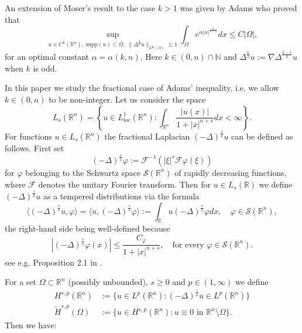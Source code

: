\documentclass[11pt, a4paper]{article}
\newcommand{\R}{\mathbb{R}}
\DeclareMathOperator{\loc}{loc}
\begin{document}

An extension of Moser's result to the case $k>1$ was given by Adams \cite{ada}  who proved that
\begin{equation}\label{stimaMT0b}
\sup_{u\in C^k(\R^{n}),\;\mathrm{supp}(u)\subset\bar\Omega,\;\|\Delta^\frac{k}{2} u\|_{L^\frac{n}{k}(\Omega)}\le 1} \int_\Omega e^{\alpha |u|^\frac{n}{n-k}}dx \le C|\Omega|,
\end{equation}
for an optimal constant $\alpha=\alpha(k,n)$. Here $k\in (0,n)\cap\mathbb{N}$ and $\Delta^\frac{k}{2} u:=\nabla\Delta^\frac{k-1}{2}u$ when $k$ is odd. 

In this paper we study the fractional case of Adams' inequality, i.e. we allow $k\in (0,n)$ to be non-integer. %
Let us consider the space
\begin{equation*}
L_{s}(\R^n)=\left\{ u\in L^{1}_{\loc}(\R^n): \int_{\R^n}\frac{|u(x)|}{1+|x|^{n+s}}dx <\infty \right\}.
\end{equation*}
For functions $u\in L_{s}(\R^n)$ the fractional Laplacian  $(-\Delta)^\frac{s}{2}u$ can be defined as follows. First set 
$$(-\Delta)^\frac{s}{2}\varphi:= \mathcal{F}^{-1}(|\xi|^{s}\mathcal{F}{\varphi}(\xi))$$
for $\varphi$ belonging to the Schwartz space $\mathcal{S}(\R^n)$ of rapidly decreasing functions, where $\mathcal{F}$ denotes the unitary Fourier transform. Then for $u\in L_{s}(\mathbb{R})$ we define $(-\Delta)^\frac{s}{2}u$ as a tempered distributions via the formula
\begin{equation}\label{deffraclap}
\langle (-\Delta)^\frac{s}{2}u,\varphi \rangle = \langle u,(-\Delta)^\frac{s}{2}\varphi \rangle:=\int_{\mathbb{R}} u (-\Delta)^\frac{s}{2}\varphi dx, \quad \varphi\in\mathcal{S}(\R^n),
\end{equation} 
the right-hand side being well-defined because
$$|(-\Delta)^\frac{s}{2}\varphi(x)|\le \frac{C_\varphi}{1+|x|^{n+s}},\quad \text{for every }\varphi \in \mathcal{S}(\R^n).$$
see e.g. Proposition 2.1 in \cite{hyd2}.

For a set  $\Omega\subset  \R^{n}$ (possibly unbounded), $s \ge 0$ and $p\in (1,\infty)$ we define 
\begin{equation}\label{defHsp}
\begin{split}
H^{s,p}(\R^n)&:=\{u\in L^p(\R^n): (-\Delta)^{\frac s2} u\in L^p(\R^n)\}\\
\tilde H^{s,p}(\Omega)&:=\{u\in H^{s,p}(\R^n): u\equiv 0\text{ in }\R^n\setminus \Omega\}.
\end{split}
\end{equation}
Then we have:
\end{document}
